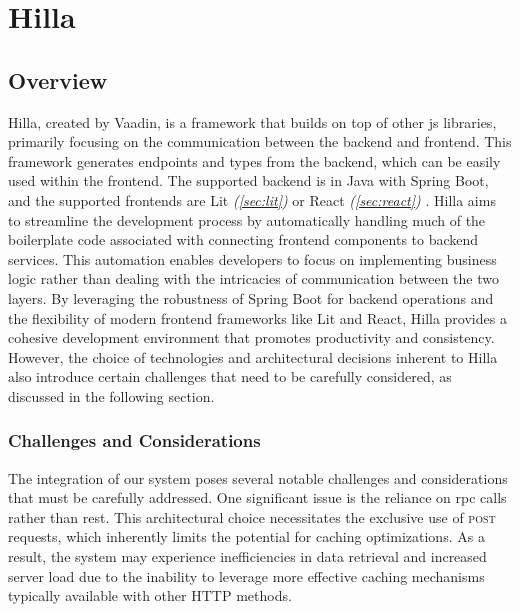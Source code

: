 \section{Hilla}
\label{sec:hilla}

\subsection{Overview}
\label{subsec:hilla:overview}

Hilla, created by Vaadin, is a framework that builds on top of other \acrshort{js} libraries, primarily focusing on the communication between the backend and frontend. This framework generates endpoints and types from the backend, which can be easily used within the frontend. The supported backend is in Java with Spring Boot, and the supported frontends are Lit \textit{(\ref{sec:lit})} \cite{hilla:lit} or React \textit{(\ref{sec:react})} \cite{hilla:react}. Hilla aims to streamline the development process by automatically handling much of the boilerplate code associated with connecting frontend components to backend services. This automation enables developers to focus on implementing business logic rather than dealing with the intricacies of communication between the two layers. By leveraging the robustness of Spring Boot for backend operations and the flexibility of modern frontend frameworks like Lit and React, Hilla provides a cohesive development environment that promotes productivity and consistency. However, the choice of technologies and architectural decisions inherent to Hilla also introduce certain challenges that need to be carefully considered, as discussed in the following section.

\subsubsection{Challenges and Considerations}
\label{subsec:hilla:challenges}

The integration of our system poses several notable challenges and considerations that must be carefully addressed. One significant issue is the reliance on \acrshort{rpc} calls rather than \acrshort{rest}. This architectural choice necessitates the exclusive use of \textsc{post} requests, which inherently limits the potential for caching optimizations. As a result, the system may experience inefficiencies in data retrieval and increased server load due to the inability to leverage more effective caching mechanisms typically available with other HTTP methods.

